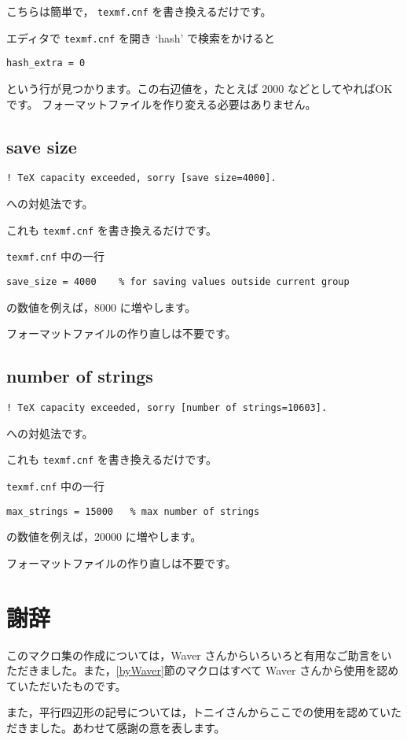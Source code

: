 \documentclass[fleqn,a4j]{jarticle}
\begin{document}
こちらは簡単で，
        \verb/texmf.cnf/
を書き換えるだけです。

エディタで \texttt{texmf.cnf} を開き `hash' で検索をかけると
\begin{jquote}
\begin{verbatim}
hash_extra = 0
\end{verbatim}
\end{jquote}
という行が見つかります。この右辺値を，たとえば 2000 などとしてやればOKです。
フォーマットファイルを作り変える必要はありません。

\subsection{save size}
\begin{jquote}
\begin{verbatim}
! TeX capacity exceeded, sorry [save size=4000].
\end{verbatim}
\end{jquote}
への対処法です。

これも
        \verb/texmf.cnf/
を書き換えるだけです。

\texttt{texmf.cnf} 中の一行
\begin{jquote}
\begin{verbatim}
save_size = 4000    % for saving values outside current group
\end{verbatim}
\end{jquote}
の数値を例えば，8000 に増やします。

フォーマットファイルの作り直しは不要です。

\subsection{number of strings}
\begin{jquote}
\begin{verbatim}
! TeX capacity exceeded, sorry [number of strings=10603].
\end{verbatim}
\end{jquote}
への対処法です。

これも
        \verb/texmf.cnf/
を書き換えるだけです。

\texttt{texmf.cnf} 中の一行
\begin{jquote}
\begin{verbatim}
max_strings = 15000   % max number of strings
\end{verbatim}
\end{jquote}
の数値を例えば，20000 に増やします。

フォーマットファイルの作り直しは不要です。

\pagebreak
\section{謝辞}
このマクロ集の作成については，Waver さんからいろいろと有用なご助言をいただきました。また，\ref{byWaver}節のマクロはすべて Waver さんから使用を認めていただいたものです。

また，平行四辺形の記号については，トニイさんからここでの使用を認めていただきました。あわせて感謝の意を表します。

\printindex
\end{document}
